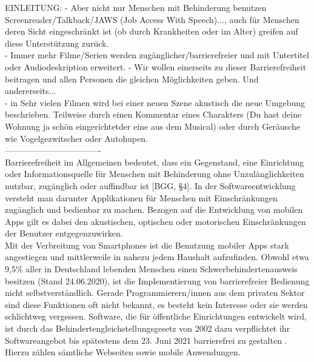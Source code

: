 
EINLEITUNG:
- \glqq Aber nicht nur Menschen mit Behinderung benutzen Screenreader/Talkback/JAWS (Job Access With Speech)..., auch für Menschen deren Sicht eingeschränkt ist (ob durch Krankheiten oder im Alter) greifen auf diese Unterstützung zurück. \grqq \\
- Immer mehr Filme/Serien werden zugänglicher/barrierefreier und mit Untertitel oder Audiodeskription erweitert. 
- Wir wollen einerseits zu dieser Barrierefreiheit beitragen und allen Personen die gleichen Möglichkeiten geben. Und andererseits...\\
- in Sehr vielen Filmen wird bei einer neuen Szene akustisch die neue Umgebung beschrieben. Teilweise durch einen Kommentar eines Charakters (\glqq Du hast deine Wohnung ja schön eingerichtet\grqq der eine aus dem Musical) oder durch Geräusche wie Vogelgezwitscher oder Autohupen.\\


----------------------------------\\
Barrierefreiheit im Allgemeinen bedeutet, dass ein Gegenstand, eine Einrichtung oder Informationsquelle für Menschen mit Behinderung ohne Unzulänglichkeiten nutzbar, zugänglich oder auffindbar ist [BGG, §4]. In der Softwareentwicklung versteht man darunter Applikationen für Menschen mit Einschränkungen zugänglich und bedienbar zu machen. Bezogen auf die Entwicklung von  mobilen Apps gilt es dabei den akustischen, optischen oder motorischen Einschränkungen der Benutzer entgegenzuwirken. \\

\noindent Mit der Verbreitung von Smartphones ist die Benutzung mobiler Apps stark angestiegen und mittlerweile in nahezu jedem Haushalt aufzufinden. Obwohl etwa 9,5\% aller in Deutschland lebenden Menschen einen Schwerbehindertenausweis besitzen (Stand 24.06.2020)\cite{schwerbehindertenausweis}, ist die Implementierung von barrierefreier Bedienung nicht selbstverständlich. Gerade Programmierern/innen aus dem privaten Sektor sind diese Funktionen oft nicht bekannt, es besteht kein Interesse oder sie werden schlichtweg vergessen. Software, die für öffentliche Einrichtungen entwickelt wird, ist durch das Behindertengleichstellungsgesetz von 2002 dazu verpflichtet ihr Softwareangebot bis spätestens dem 23. Juni 2021 barrierefrei zu gestalten \cite{behindertengleichstellungsgesetz}. Hierzu zählen sämtliche Webseiten sowie mobile Anwendungen. \\

